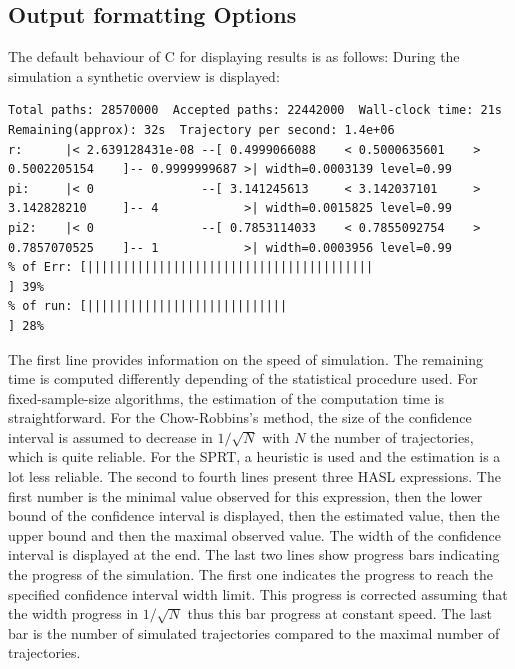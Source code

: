 \documentclass{article}
\newcommand{\cosmos}{\mbox{\textup{C}\scalebox{0.75}{{\textsc{OSMOS}}}}}
\begin{document}
\subsection{Output formatting Options}
The default behaviour of \cosmos{} for displaying results is as follows:
During the simulation a synthetic overview is displayed:
\begin{scriptsize}
\begin{verbatim}
Total paths: 28570000  Accepted paths: 22442000  Wall-clock time: 21s  Remaining(approx): 32s  Trajectory per second: 1.4e+06
r:      |< 2.639128431e-08 --[ 0.4999066088    < 0.5000635601    > 0.5002205154    ]-- 0.9999999687 >| width=0.0003139 level=0.99
pi:     |< 0               --[ 3.141245613     < 3.142037101     > 3.142828210     ]-- 4            >| width=0.0015825 level=0.99
pi2:    |< 0               --[ 0.7853114033    < 0.7855092754    > 0.7857070525    ]-- 1            >| width=0.0003956 level=0.99
% of Err: [||||||||||||||||||||||||||||||||||||||||                                                       ] 39%	
% of run: [||||||||||||||||||||||||||||                                                                   ] 28%	
\end{verbatim}
\end{scriptsize}
The first line provides information on the speed of simulation. The
remaining time is computed differently depending of the statistical
procedure used. For fixed-sample-size algorithms, the estimation of
the computation time is straightforward. For the Chow-Robbins’s method,
the size of the confidence interval is assumed to decrease in
$1/\sqrt{N}$ with $N$ the number of trajectories, which is quite
reliable. For the SPRT, a heuristic is used and the estimation is a lot
less reliable.  The second to fourth lines present three HASL
expressions. The first number is the minimal value observed for this
expression, then the lower bound of the confidence interval is
displayed, then the estimated value, then the upper bound and then the
maximal observed value. The width of the confidence interval is
displayed at the end.  The last two lines show progress bars indicating
the progress of the simulation. The first one indicates the progress to
reach the specified confidence interval width limit. This progress is
corrected assuming that the width progress in $1/\sqrt{N}$ thus this
bar progress at constant speed. The last bar is the number of
simulated trajectories compared to the maximal number of trajectories.
\end{document}
